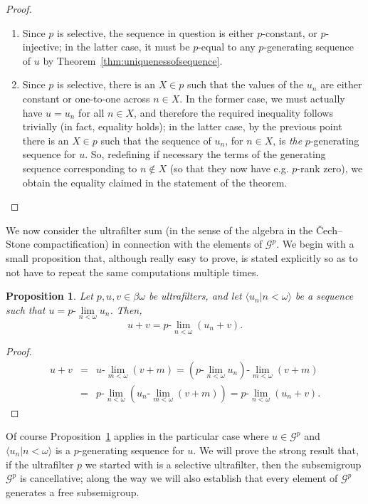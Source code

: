 \documentclass[10pt]{amsart}
\newcommand{\ulim}[2]{#1\text{-}\lim\limits_{#2<\omega}}
\newtheorem{proposition}[theorem]{Proposition}
\theoremstyle{definition}
\theoremstyle{remark}
\begin{document}
\begin{proof}\hfill
\begin{enumerate}
    \item Since $p$ is selective, the sequence in question is either $p$-constant, or $p$-injective; in the latter case, it must be $p$-equal to any $p$-generating sequence of $u$ by Theorem~\ref{thm:uniquenessofsequence}.
    \item Since $p$ is selective, there is an $X\in p$ such that the values of the $u_n$ are either constant or one-to-one across $n\in X$. In the former case, we must actually have $u=u_n$ for all $n\in X$, and therefore the required inequality follows trivially (in fact, equality holds); in the latter case, by the previous point there is an $X\in p$ such that the sequence of $u_n$, for $n\in X$, is {\it the} $p$-generating sequence for $u$. So, redefining if necessary the terms of the generating sequence corresponding to $n\notin X$ (so that they now have e.g. $p$-rank zero), we obtain the equality claimed in the statement of the theorem.
\end{enumerate}
\end{proof}

We now consider the ultrafilter sum (in the sense of the algebra in the \v{C}ech--Stone compactification) in connection with the elements of $\mathscr G^p$. We begin with a small proposition that, although really easy to prove, is stated explicitly so as to not have to repeat the same computations multiple times.

\begin{proposition}\label{prop:talachasuma}
Let $p,u,v\in\beta\omega$ be ultrafilters, and let $\langle u_n\big|n<\omega\rangle$ be a sequence such that $u=\ulim{p}{n}u_n$. Then,
\begin{equation*}
    u+v=\ulim{p}{n}(u_n+v).
\end{equation*}
\end{proposition}

\begin{proof}
    \begin{eqnarray*}
    u+v & = & \ulim{u}{m}(v+m)=\ulim{\left(\ulim{p}{n}u_n\right)}{m}(v+m) \\
     & = & \ulim{p}{n}\left(\ulim{u_n}{m}(v+m)\right)=\ulim{p}{n}(u_n+v).
    \end{eqnarray*}
\end{proof}

Of course Proposition~\ref{prop:talachasuma} applies in the particular case where $u\in\mathscr G^p$ and $\langle u_n\big|n<\omega\rangle$ is a $p$-generating sequence for $u$. We will prove the strong result that, if the ultrafilter $p$ we started with is a selective ultrafilter, then the subsemigroup $\mathscr G^p$ is cancellative; along the way we will also establish that every element of $\mathscr G^p$ generates a free subsemigroup.
\end{document}
